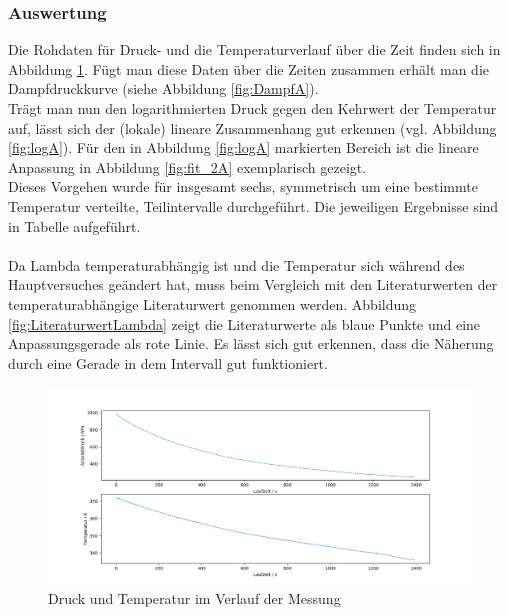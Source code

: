 \documentclass[12pt,a4paper]{article}
\begin{document}
\subsubsection{Auswertung}
Die Rohdaten für Druck- und die Temperaturverlauf über die Zeit finden sich in Abbildung \ref{fig:RohdatenA}. Fügt man diese Daten über die Zeiten zusammen erhält man die Dampfdruckkurve (siehe Abbildung \ref{fig:DampfA}).\\
Trägt man nun den logarithmierten Druck gegen den Kehrwert der Temperatur auf, lässt sich der (lokale) lineare Zusammenhang gut erkennen (vgl. Abbildung \ref{fig:logA}). Für den in Abbildung \ref{fig:logA} markierten Bereich ist die lineare Anpassung in Abbildung \ref{fig:fit_2A} exemplarisch gezeigt.\\
Dieses Vorgehen wurde für insgesamt sechs, symmetrisch um eine bestimmte Temperatur verteilte, Teilintervalle durchgeführt. Die jeweiligen Ergebnisse sind in Tabelle %
aufgeführt.\\
\\Da Lambda temperaturabhängig ist und die Temperatur sich während des Hauptversuches geändert hat, muss beim Vergleich mit den Literaturwerten der temperaturabhängige Literaturwert genommen werden. Abbildung \ref{fig:LiteraturwertLambda} zeigt die Literaturwerte als blaue Punkte und eine Anpassungsgerade als rote Linie. Es lässt sich gut erkennen, dass die Näherung durch eine Gerade in dem Intervall gut funktioniert.


\begin{figure}
\includegraphics[width=\linewidth]{Bilder/Rohdaten_HauptmessungA.png}
\caption[Dichtigkeit vor Hauptversuch Apparatur A]{Druck und Temperatur im Verlauf der Messung}
\label{fig:RohdatenA}
\end{figure}
\end{document}
